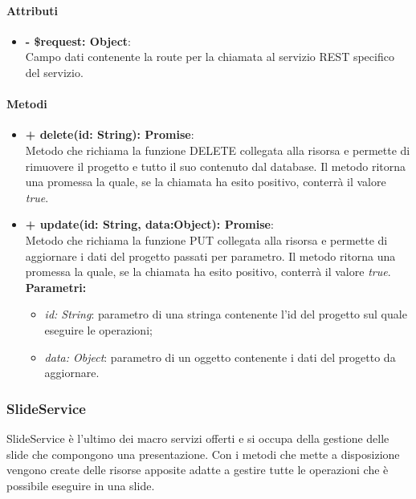 		\paragraph{Attributi}
		\begin{itemize}
			\item \textbf{- \$request: Object}:\\
			Campo dati contenente la route per la chiamata al servizio REST specifico del servizio.
		\end{itemize}	
		
		\paragraph{Metodi}
		\begin{itemize}
			\item \textbf{+ delete(id: String): Promise}:\\
			Metodo che richiama la funzione DELETE collegata alla risorsa e permette di rimuovere il progetto e tutto il suo contenuto dal database. Il metodo ritorna una promessa la quale, se la chiamata ha esito positivo, conterrà il valore \textit{true}.\\
			\item \textbf{+ update(id: String, data:Object): Promise}:\\
			Metodo che richiama la funzione PUT collegata alla risorsa e permette di aggiornare i dati del progetto passati per parametro. Il metodo ritorna una promessa la quale, se la chiamata ha esito positivo, conterrà il valore \textit{true}.\\
			\textbf{Parametri:}\\
			\begin{itemize}
				\item \textit{id: String}: parametro di una stringa contenente l'id del progetto sul quale eseguire le operazioni;
				\item \textit{data: Object}: parametro di un oggetto contenente i dati del progetto da aggiornare.
			\end{itemize}
		\end{itemize}


\subsubsection{SlideService}
SlideService è l'ultimo dei macro servizi offerti e si occupa della gestione delle slide che compongono una presentazione. Con i metodi che mette a disposizione vengono create delle risorse apposite adatte a gestire tutte le operazioni che è possibile eseguire in una slide.


